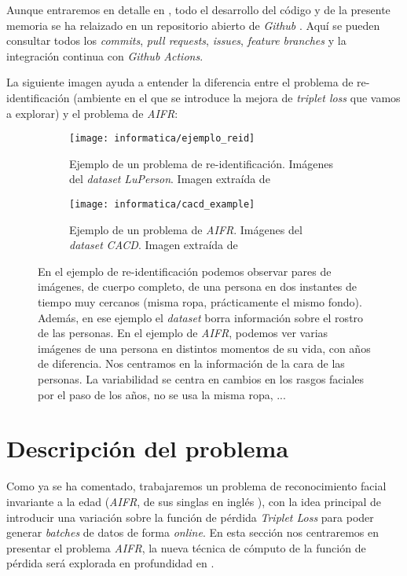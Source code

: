 Aunque entraremos en detalle en , todo el desarrollo del código y de la presente memoria se ha relaizado en un repositorio abierto de \textit{Github} \cite{informatica:repogithub}. Aquí se pueden consultar todos los \textit{commits}, \textit{pull requests}, \textit{issues}, \textit{feature branches} y la integración continua con \textit{Github Actions}.

La siguiente imagen ayuda a entender la diferencia entre el problema de re-identificación (ambiente en el que se introduce la mejora de \textit{triplet loss} que vamos a explorar) y el problema de \textit{AIFR}:

\begin{figure}[H]
    \centering
    \ajustarsubcaptions
    \begin{subfigure}{0.4\textwidth}
        \texttt{[image: informatica/ejemplo\_reid]}
        \caption{Ejemplo de un problema de re-identificación. Imágenes del \textit{dataset} \textit{LuPerson}. Imagen extraída de \cite{informatica:luperson}}
    \end{subfigure}%
    \begin{subfigure}{0.6\textwidth}
        \texttt{[image: informatica/cacd\_example]}
        \caption{Ejemplo de un problema de \textit{AIFR}. Imágenes del \textit{dataset} \textit{CACD}. Imagen extraída de \cite{informatica:paper_cacd}}
    \end{subfigure}

    \caption{En el ejemplo de re-identificación podemos observar pares de imágenes, de cuerpo completo, de una persona en dos instantes de tiempo muy cercanos (misma ropa, prácticamente el mismo fondo). Además, en ese ejemplo el \textit{dataset} borra información sobre el rostro de las personas. En el ejemplo de \textit{AIFR}, podemos ver varias imágenes de una persona en distintos momentos de su vida, con años de diferencia. Nos centramos en la información de la cara de las personas. La variabilidad se centra en cambios en los rasgos faciales por el paso de los años, no se usa la misma ropa, ...}
\end{figure}

\section{Descripción del problema} \label{ich:descrp_problema}

Como ya se ha comentado, trabajaremos un problema de reconocimiento facial invariante a la edad (\textit{AIFR}, de sus singlas en inglés ), con la idea principal de introducir una variación sobre la función de pérdida \textit{Triplet Loss} para poder generar \textit{batches} de datos de forma \textit{online}. En esta sección nos centraremos en presentar el problema \textit{AIFR}, la nueva técnica de cómputo de la función de pérdida será explorada en profundidad en .


